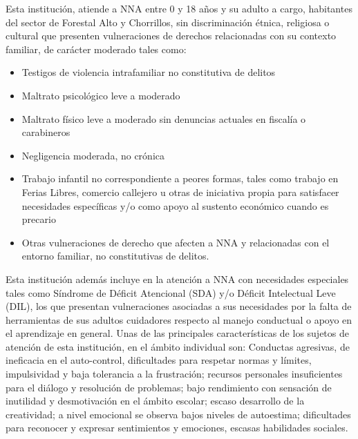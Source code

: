 Esta institución, atiende a NNA entre 0 y 18 años  y su adulto a cargo, habitantes del sector de Forestal Alto y Chorrillos, sin discriminación étnica, religiosa o cultural que presenten vulneraciones de derechos relacionadas con su contexto familiar, de carácter moderado tales como:

\begin{itemize}
	\item Testigos de violencia intrafamiliar no constitutiva de delitos
	\item Maltrato psicológico leve a moderado
	\item Maltrato físico leve a moderado sin denuncias actuales en fiscalía o carabineros
	\item Negligencia moderada, no crónica
	\item Trabajo infantil no correspondiente a peores formas, tales como trabajo en Ferias Libres, comercio callejero u otras de iniciativa propia para satisfacer necesidades específicas y/o como apoyo al sustento económico cuando es precario
	\item Otras vulneraciones de derecho que afecten a NNA y relacionadas con el entorno familiar, no constitutivas de delitos.
	
\end{itemize} 

Esta institución además incluye en la atención a NNA con necesidades especiales tales como Síndrome de Déficit Atencional (SDA) y/o Déficit Intelectual Leve (DIL), los que presentan vulneraciones asociadas a sus necesidades por la falta de herramientas de sus adultos cuidadores respecto al manejo conductual o apoyo en el aprendizaje en general.
Unas de las principales características de los sujetos de atención de esta institución, en el ámbito individual son:
Conductas agresivas, de ineficacia en el auto-control, dificultades para respetar normas y límites, impulsividad y baja tolerancia a la frustración; recursos personales insuficientes para el diálogo y resolución de problemas; bajo rendimiento con sensación de inutilidad y desmotivación en el ámbito escolar; escaso desarrollo de la creatividad; a nivel emocional se observa bajos niveles de autoestima; dificultades para reconocer y expresar sentimientos y emociones, escasas habilidades sociales.\\

